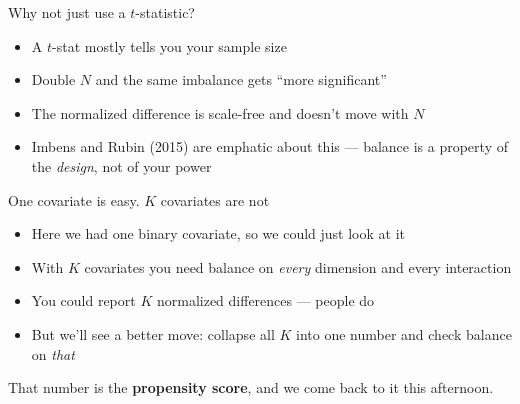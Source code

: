\documentclass{beamer}
\newcommand{\highlight}[1]{\textcolor{accent}{\textbf{#1}}}
\begin{document}
\begin{frame}{Why not just use a $t$-statistic?}

\begin{itemize}
\item A $t$-stat mostly tells you your sample size
\item Double $N$ and the same imbalance gets ``more significant''
\item The normalized difference is scale-free and doesn't move with $N$
\item Imbens and Rubin (2015) are emphatic about this --- balance is a property of the \emph{design}, not of your power
\end{itemize}

\end{frame}


\begin{frame}{One covariate is easy. $K$ covariates are not}

\begin{itemize}
\item Here we had one binary covariate, so we could just look at it
\item With $K$ covariates you need balance on \emph{every} dimension and every interaction
\item You could report $K$ normalized differences --- people do
\item But we'll see a better move: collapse all $K$ into one number and check balance on \emph{that}
\end{itemize}

\vspace{0.5em}

That number is the \highlight{propensity score}, and we come back to it this afternoon.

\end{frame}
\end{document}
